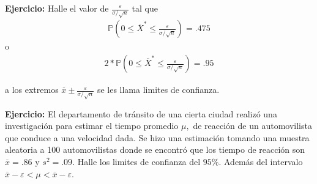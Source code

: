 \documentclass{article}
\newcommand{\Prb}{\mathbb{P}}
\begin{document}
\textbf{Ejercicio:}
Halle el valor de $\frac{\varepsilon }{\sigma/\sqrt{n}}$ tal que
\begin{align*}
    \Prb( 0 \leq \overline{X}^* \leq \frac{\varepsilon }{\sigma/\sqrt{n}} ) = .475
\end{align*}
o 
\begin{align*}
    2*\Prb( 0 \leq \overline{X}^* \leq \frac{\varepsilon }{\sigma/\sqrt{n}} ) = .95
\end{align*}

a los extremos $\overline{x}\pm \frac{\varepsilon }{\sigma/\sqrt{n}}$ se les llama limites de confianza.


\textbf{Ejercicio:}
El departamento de tránsito de una cierta ciudad realizó una investigación para estimar el tiempo promedio $\mu,$ de reacción de un automovilista que conduce a una velocidad dada. Se hizo una estimación tomando una muestra aleatoria a 100 automovilistas donde se encontró que los tiempo de reacción son  $\overline{x}=.86$ y $s^2=.09$. Halle los limites de confianza del $95\%$. Además del intervalo $\overline{x}-\varepsilon < \mu < \overline{x}-\varepsilon$.
\end{document}
